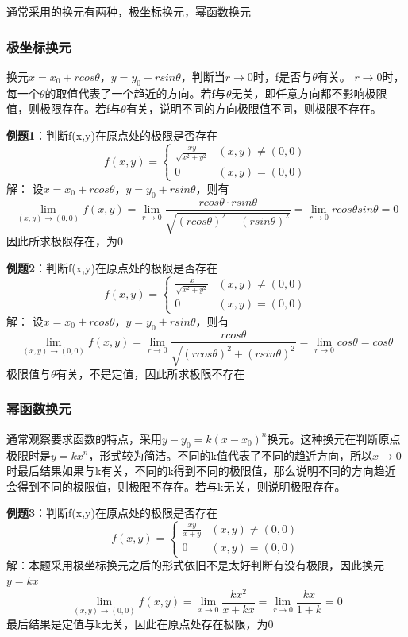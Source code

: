 \documentclass{article}
\begin{document}
通常采用的换元有两种，极坐标换元，幂函数换元
\subsubsection{极坐标换元}
换元$x=x_0+rcos\theta$，$y=y_0+rsin\theta$，判断当$r \rightarrow 0$时，f是否与$\theta$有关。
$r \rightarrow 0$时，每一个$\theta$的取值代表了一个趋近的方向。若f与$\theta$无关，即任意方向都不影响极限值，则极限存在。若f与$\theta$有关，说明不同的方向极限值不同，则极限不存在。

\textbf{例题1}：判断f(x,y)在原点处的极限是否存在
\[f(x,y)= \begin{cases} \frac{xy}{ \sqrt{x^2+y^2} }  & (x,y) \neq (0,0)\\0 & (x,y) = (0,0)\end{cases}\]
\quad \quad 解：
设$x=x_0+rcos\theta$，$y=y_0+rsin\theta$，则有
\[\lim\limits_{(x,y) \rightarrow (0,0)}f(x,y)=  
\lim\limits_{r \rightarrow 0}  \frac{rcos\theta  \cdot rsin\theta}{ \sqrt{(rcos\theta)^2+(rsin\theta)^2} }= 
\lim\limits_{r \rightarrow 0}rcos\theta sin\theta = 0\]
因此所求极限存在，为0

\textbf{例题2}：判断f(x,y)在原点处的极限是否存在
\[f(x,y)= \begin{cases} \frac{x}{ \sqrt{x^2+y^2} }  & (x,y) \neq (0,0)\\0 & (x,y) = (0,0)\end{cases}\]
\quad \quad 解：
设$x=x_0+rcos\theta$，$y=y_0+rsin\theta$，则有
\[\lim\limits_{(x,y) \rightarrow (0,0)}f(x,y)=  
\lim\limits_{r \rightarrow 0}  \frac{rcos\theta}{ \sqrt{(rcos\theta)^2+(rsin\theta)^2} }= 
\lim\limits_{r \rightarrow 0}cos\theta = cos\theta\]
极限值与$\theta$有关，不是定值，因此所求极限不存在

\subsubsection{幂函数换元}
通常观察要求函数的特点，采用$y-y_0=k(x-x_0)^n$换元。这种换元在判断原点极限时是$y=kx^n$，形式较为简洁。不同的k值代表了不同的趋近方向，所以$x \rightarrow 0$时最后结果如果与k有关，不同的k得到不同的极限值，那么说明不同的方向趋近会得到不同的极限值，则极限不存在。若与k无关，则说明极限存在。

\textbf{例题3}：判断f(x,y)在原点处的极限是否存在
\[f(x,y)= \begin{cases} \frac{xy}{ x+y }  & (x,y) \neq (0,0)\\0 & (x,y) = (0,0)\end{cases}\]
\quad \quad 解：本题采用极坐标换元之后的形式依旧不是太好判断有没有极限，因此换元$y=kx$
\[\lim\limits_{(x,y) \rightarrow (0,0)}f(x,y)=  
\lim\limits_{x \rightarrow 0}  \frac{kx^2}{x+kx}= 
\lim\limits_{r \rightarrow 0}  \frac{kx}{1+k}  = 0\]
最后结果是定值与k无关，因此在原点处存在极限，为0
\end{document}
